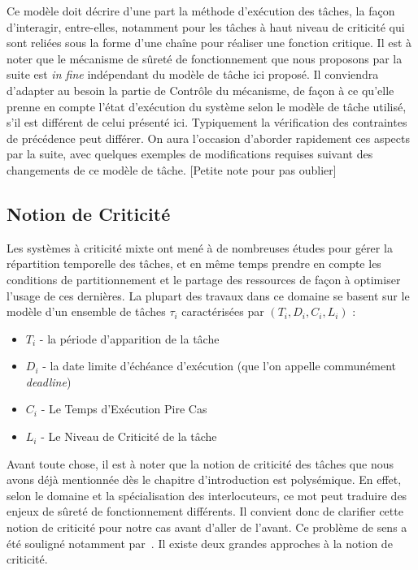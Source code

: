 \documentclass[french, a4paper, 11pt, twoside, pdftex]{StyleThese}
\begin{document}
    
    Ce modèle doit décrire d'une part la méthode d'exécution des tâches, la façon d'interagir, entre-elles, notamment pour les tâches à haut niveau de criticité qui sont reliées sous la forme d'une chaîne pour réaliser une fonction critique. Il est à noter que le mécanisme de sûreté de fonctionnement que nous proposons par la suite est \textit{in fine} indépendant du modèle de tâche ici proposé. Il conviendra d'adapter au besoin la partie de Contrôle du mécanisme, de façon à ce qu'elle prenne en compte l'état d'exécution du système selon le modèle de tâche utilisé, s'il est différent de celui présenté ici. Typiquement la vérification des contraintes de précédence peut différer. On aura l'occasion d'aborder rapidement ces aspects par la suite, avec quelques exemples de modifications requises suivant des changements de ce modèle de tâche. \alert{[Petite note pour pas oublier]}
    
    
    \subsection{Notion de Criticité}
    	
    Les systèmes à criticité mixte ont mené à de nombreuses études pour gérer la répartition temporelle des tâches, et en même temps prendre en compte les conditions de partitionnement et le partage des ressources de façon à optimiser l'usage de ces dernières. La plupart des travaux dans ce domaine se basent sur le modèle d'un ensemble de tâches $\tau_i$ caractérisées par $ (T_i,D_i,C_i,L_i) $ : 
    \begin{itemize}
    	\item $T_i$ - la période d'apparition de la tâche
    	\item $D_i$ - la date limite d'échéance d'exécution (que l'on appelle communément \textit{deadline})
    	\item $C_i$ - Le Temps d'Exécution Pire Cas %
    	\item $L_i$ - Le Niveau de Criticité de la tâche
    \end{itemize}
     
    Avant toute chose, il est à noter que la notion de criticité des tâches que nous avons déjà mentionnée dès le chapitre d'introduction est polysémique. En effet, selon le domaine et la spécialisation des interlocuteurs, ce mot peut traduire des enjeux de sûreté de fonctionnement différents. Il convient donc de clarifier cette notion de criticité pour notre cas avant d'aller de l'avant. Ce problème de sens a été souligné notamment par~\cite{graydon_safety_2013}. Il existe deux grandes approches à la notion de criticité. 
    
\end{document}
